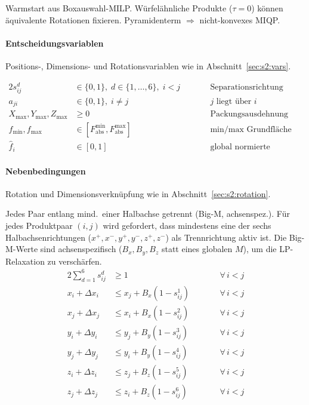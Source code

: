 \documentclass[10pt]{article}
\begin{document}
Warmstart aus Boxauswahl-MILP.
W\"urfel\"ahnliche Produkte ($\tau = 0$) k\"onnen
\"aquivalente Rotationen fixieren.
Pyramidenterm $\Rightarrow$ nicht-konvexes MIQP.

\paragraph{Entscheidungsvariablen}

Positions-, Dimensions- und Rotationsvariablen wie in Abschnitt~\ref{sec:s2:vars}.

\begin{alignat*}{2}
s_{ij}^d &\in \{0,1\},\; d \in \{1,\dots,6\},\; i < j
  &\qquad& \text{Separationsrichtung} \\
a_{ji} &\in \{0,1\},\; i \neq j
  && \text{$j$ liegt \"uber $i$} \\
X_{\max}, Y_{\max}, Z_{\max} &\geq 0
  && \text{Packungsausdehnung} \\
f_{\min}, f_{\max} &\in [F_{\mathrm{abs}}^{\min}, F_{\mathrm{abs}}^{\max}]
  && \text{min/max Grundfl\"ache} \\
\hat{f}_i &\in [0, 1]
  && \text{global normierte Grundfl\"ache}
\end{alignat*}

\paragraph{Nebenbedingungen}

Rotation und Dimensionsverkn\"upfung wie in Abschnitt~\ref{sec:s2:rotation}.

\label{sec:s2:nooverlap}
Jedes Paar entlang mind.\ einer Halbachse getrennt (Big-M, achsenspez.).
F\"ur jedes Produktpaar $(i,j)$ wird gefordert, dass mindestens eine
der sechs Halbachsenrichtungen ($x^+, x^-, y^+, y^-, z^+, z^-$) als
Trennrichtung aktiv ist.
Die Big-M-Werte sind achsenspezifisch ($B_x, B_y, B_z$ statt eines
globalen $M$), um die LP-Relaxation zu versch\"arfen.
\begin{alignat*}{2}
\textstyle\sum_{d=1}^{6} s_{ij}^d &\geq 1
  &\qquad& \forall\, i < j \\[4pt]
x_i + \Delta x_i &\leq x_j + B_x(1 - s_{ij}^1)
  && \forall\, i < j \\
x_j + \Delta x_j &\leq x_i + B_x(1 - s_{ij}^2)
  && \forall\, i < j \\
y_i + \Delta y_i &\leq y_j + B_y(1 - s_{ij}^3)
  && \forall\, i < j \\
y_j + \Delta y_j &\leq y_i + B_y(1 - s_{ij}^4)
  && \forall\, i < j \\
z_i + \Delta z_i &\leq z_j + B_z(1 - s_{ij}^5)
  && \forall\, i < j \\
z_j + \Delta z_j &\leq z_i + B_z(1 - s_{ij}^6)
  && \forall\, i < j
\end{alignat*}
\end{document}
